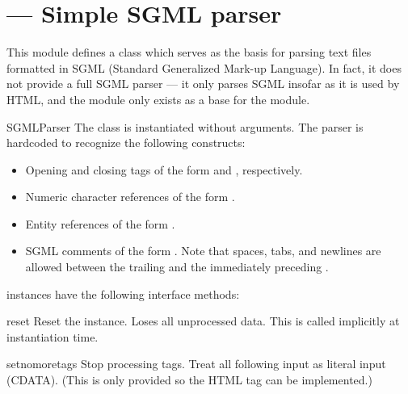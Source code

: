 \section{ ---
         Simple SGML parser}



This module defines a class  which serves as the
basis for parsing text files formatted in SGML (Standard Generalized
Mark-up Language).  In fact, it does not provide a full SGML parser
--- it only parses SGML insofar as it is used by HTML, and the module
only exists as a base for the 
module.


\begin{classdesc}{SGMLParser}{}
The  class is instantiated without arguments.
The parser is hardcoded to recognize the following
constructs:

\begin{itemize}
\item
Opening and closing tags of the form
 and
, respectively.

\item
Numeric character references of the form .

\item
Entity references of the form .

\item
SGML comments of the form .  Note that
spaces, tabs, and newlines are allowed between the trailing
\samp{>} and the immediately preceding \samp{--}.

\end{itemize}
\end{classdesc}

 instances have the following interface methods:


\begin{methoddesc}{reset}{}
Reset the instance.  Loses all unprocessed data.  This is called
implicitly at instantiation time.
\end{methoddesc}

\begin{methoddesc}{setnomoretags}{}
Stop processing tags.  Treat all following input as literal input
(CDATA).  (This is only provided so the HTML tag
 can be implemented.)
\end{methoddesc}

